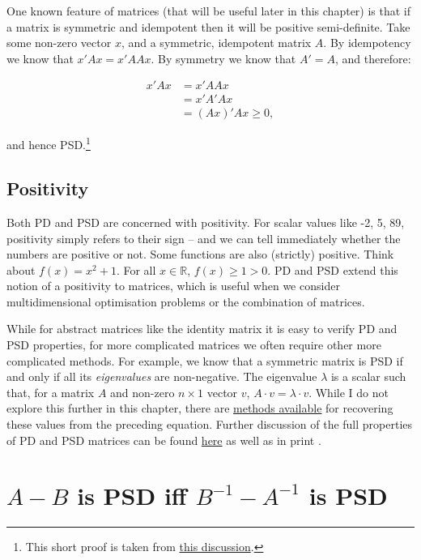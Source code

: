 \documentclass[
]{book}
\begin{document}
One known feature of matrices (that will be useful later in this chapter) is that if a matrix is symmetric and idempotent then it will be positive semi-definite. Take some non-zero vector \(x\), and a symmetric, idempotent matrix \(A\). By idempotency we know that \(x'Ax = x'AAx\). By symmetry we know that \(A' = A\), and therefore:

\[
\begin{aligned}
x'Ax &= x'AAx \\
&= x'A'Ax \\
&= (Ax)'Ax \geq 0,
\end{aligned}
\]

and hence PSD.\footnote{This short proof is taken from \href{https://www.reddit.com/r/math/comments/9ni2x/why_does_symmetry_and_idempotence_imply}{this discussion}.}

\hypertarget{positivity}{%
\subsection{Positivity}\label{positivity}}

Both PD and PSD are concerned with positivity. For scalar values like -2, 5, 89, positivity simply refers to their sign -- and we can tell immediately whether the numbers are positive or not. Some functions are also (strictly) positive. Think about \(f(x) = x^2 + 1\). For all \(x \in \mathbb{R}\), \(f(x) \geq 1 > 0\). PD and PSD extend this notion of a positivity to matrices, which is useful when we consider multidimensional optimisation problems or the combination of matrices.

While for abstract matrices like the identity matrix it is easy to verify PD and PSD properties, for more complicated matrices we often require other more complicated methods. For example, we know that a symmetric matrix is PSD if and only if all its \emph{eigenvalues} are non-negative. The eigenvalue \(\lambda\) is a scalar such that, for a matrix \(A\) and non-zero \(n\times 1\) vector \(v\), \(A\cdot v = \lambda \cdot v\). While I do not explore this further in this chapter, there are \href{https://lpsa.swarthmore.edu/MtrxVibe/EigMat/MatrixEigen.html}{methods available} for recovering these values from the preceding equation. Further discussion of the full properties of PD and PSD matrices can be found \href{http://theanalysisofdata.com/probability/C_4.html}{here} as well as in print \citep[e.g.~][Chapter 7]{horn_2013}.

\hypertarget{a-b-is-psd-iff-b-1---a-1-is-psd}{%
\section{\texorpdfstring{\(A-B\) is PSD iff \(B^{-1} - A^{-1}\) is PSD}{A-B is PSD iff B\^{}\{-1\} - A\^{}\{-1\} is PSD}}\label{a-b-is-psd-iff-b-1---a-1-is-psd}}
\end{document}
